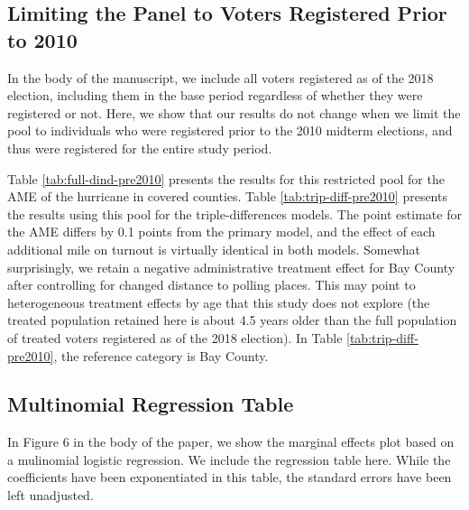 \documentclass[
  12pt,
]{article}
\begin{document}
\hypertarget{limiting-the-panel-to-voters-registered-prior-to-2010}{%
\subsection*{Limiting the Panel to Voters Registered Prior to 2010}\label{limiting-the-panel-to-voters-registered-prior-to-2010}}

In the body of the manuscript, we include all voters registered as of the 2018 election, including them in the base period regardless of whether they were registered or not. Here, we show that our results do not change when we limit the pool to individuals who were registered prior to the 2010 midterm elections, and thus were registered for the entire study period.

Table \ref{tab:full-dind-pre2010} presents the results for this restricted pool for the AME of the hurricane in covered counties. Table \ref{tab:trip-diff-pre2010} presents the results using this pool for the triple-differences models. The point estimate for the AME differs by 0.1 points from the primary model, and the effect of each additional mile on turnout is virtually identical in both models. Somewhat surprisingly, we retain a negative administrative treatment effect for Bay County after controlling for changed distance to polling places. This may point to heterogeneous treatment effects by age that this study does not explore (the treated population retained here is about 4.5 years older than the full population of treated voters registered as of the 2018 election). In Table \ref{tab:trip-diff-pre2010}, the reference category is Bay County.

\newpage
\begin{landscape}
\begin{singlespace}

\newpage

\end{singlespace}
\end{landscape}

\hypertarget{multinomial-regression-table}{%
\subsection*{Multinomial Regression Table}\label{multinomial-regression-table}}

In Figure 6 in the body of the paper, we show the marginal effects plot based on a mulinomial logistic regression. We include the regression table here. While the coefficients have been exponentiated in this table, the standard errors have been left unadjusted.
\end{document}
